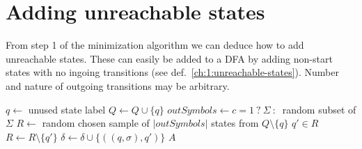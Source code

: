\section{Adding unreachable states}

From step 1 of the minimization algorithm we can deduce how to add unreachable states. These can easily be added to a DFA by adding non-start states with no ingoing transitions (see def.~\ref{ch:1:unreachable-states}). Number and nature of outgoing transitions may be arbitrary.

\vspace{0.2cm}
\begin{algorithmic}[1]
		\State $q \gets$ unused state label
		\State $Q \gets Q \cup \{ q \}$
        \State $outSymbols \gets c = 1\ ?\ \Sigma\ :\ $ random subset of $\Sigma$
		\State $R \gets$ random chosen sample of $|outSymbols|$ states from $Q \setminus \{q\}$
			\State $q' \in R$
			\State $R \gets R \setminus \{q'\}$
			\State $\delta \gets \delta \cup \{ ((q, \sigma), q') \}$
		\EndFor
	\EndFor
	\State \Return $A$
	\EndFunction
\end{algorithmic}
\vspace{0.2cm}

%
